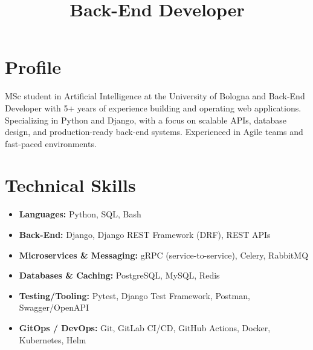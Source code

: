 \documentclass[11pt,a4paper,sans]{moderncv}
\title{Back-End Developer} %
\begin{document}
\makecvtitle

\vspace {-2em}

\section{Profile}
\vspace{-1mm}
MSc student in Artificial Intelligence at the University of Bologna and Back-End Developer with 5+ years of experience building and operating web applications. Specializing in Python and Django, with a focus on scalable APIs, database design, and production-ready back-end systems. Experienced in Agile teams and fast-paced environments.

    
    


\section{Technical Skills}
\begin{itemize}
    \item \textbf{Languages:} Python, SQL, Bash
    \item \textbf{Back-End:} Django, Django REST Framework (DRF), REST APIs
    \item \textbf{Microservices \& Messaging:} gRPC (service-to-service), Celery, RabbitMQ
    \item \textbf{Databases \& Caching:} PostgreSQL, MySQL, Redis
    \item \textbf{Testing/Tooling:} Pytest, Django Test Framework, Postman, Swagger/OpenAPI
    \item \textbf{GitOps / DevOps:} Git, GitLab CI/CD, GitHub Actions, Docker, Kubernetes, Helm
\end{itemize}
\end{document}
